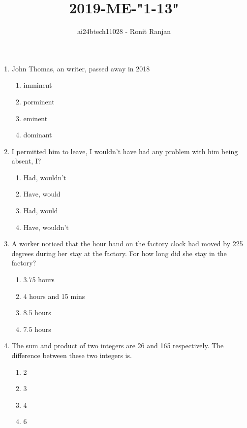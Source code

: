 \documentclass[journal,12pt,onecolumn]{IEEEtran}
\theoremstyle{remark}
\begin{document}

\vspace{3cm}

\title{2019-ME-"1-13"}
\author{ai24btech11028 - Ronit Ranjan}
\maketitle
\bigskip

\begin{enumerate}
    \item John Thomas, an \underline{\hspace{2cm}} writer, passed away in 2018
    \begin{enumerate}
        \item imminent
        \item porminent
        \item eminent
        \item dominant
    \end{enumerate}

    \item \underline{\hspace{2cm}} I permitted him to leave, I wouldn't have had any problem with him being absent,\underline{\hspace{2cm}} I?
    \begin{enumerate}
        \item Had, wouldn't
        \item Have, would
        \item Had, would
        \item Have, wouldn't
    \end{enumerate}

    \item A worker noticed that the hour hand on the factory clock had moved by 225 degrees during her stay at the factory. For how long did she stay in the factory?
    \begin{enumerate}
        \item 3.75 hours
        \item 4 hours and 15 mins
        \item 8.5 hours
        \item 7.5 hours
    \end{enumerate}

    \item The sum and product of two integers are 26 and 165 respectively. The difference between these two integers is\underline{\hspace{2cm}}.
    \begin{enumerate}
        \item 2
        \item 3
        \item 4
        \item 6
    \end{enumerate}


\end{enumerate}
\end{document}

